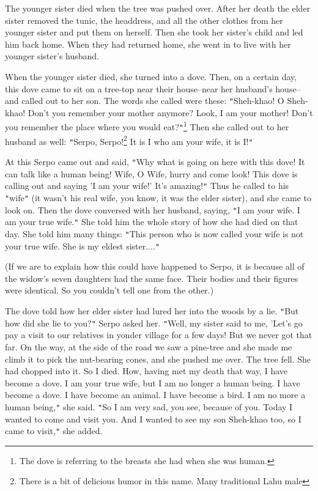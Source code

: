 The younger sister died when the tree was pushed over. After her death the elder
sister removed the tunic, the headdress, and all the other clothes from her younger
sister and put them on herself. Then she took her sister's child and led him back
home. When they had returned home, she went in to live with her younger sister's
husband.

When the younger sister died, she turned into a dove. Then, on a certain day, this
dove came to sit on a tree-top near their house--near her husband's house--and
called out to her son. The words she called were these: \texttt{"}Sheh-khao! O
Sheh-khao! Don't you remember your mother anymore? Look, I am your mother! Don't
you remember the place where you would eat?\texttt{"}\footnote{The dove is referring to the breasts she had when she was human.} Then she called out to
her husband as well: \texttt{"}Serpo, Serpo!\footnote{There is a bit of delicious humor in this name. Many traditional Lahu male} It is I who am your wife, it is
I!\texttt{"}

At this Serpo came out and said, \texttt{"}Why what is going on here with this
dove! It can talk like a human being! Wife, O Wife, hurry and come look! This dove
is calling out and saying 'I am your wife!' It's amazing!\texttt{"} Thus he called
to his \texttt{"}wife\texttt{"} (it wasn't his real wife, you know, it was the
elder sister), and she came to look on. Then the dove conversed with her husband,
saying, \texttt{"}I am your wife. I am your true wife.\texttt{"} She told him the
whole story of how she had died on that day. She told him many things: \texttt{"}This
person who is now called your wife is not your true wife. She is my eldest sister....\texttt{"}

(If we are to explain how this could have happened to Serpo, it is because all
of the widow's seven daughters had the same face. Their bodies and their figures
were identical. So you couldn't tell one from the other.)

The dove told how her elder sister had lured her into the woods by a lie. \texttt{"}But
how did she lie to you?\texttt{"} Serpo asked her. \texttt{"}Well, my sister said
to me, 'Let's go pay a visit to our relatives in yonder village for a few days!
But we never got that far. On the way, at the side of the road we saw a pine-tree
and she made me climb it to pick the nut-bearing cones, and she pushed me over.
The tree fell. She had chopped into it. So I died. How, having met my death that
way, I have become a dove. I am your true wife, but I am no longer a human being.
I have become a dove. I have become an animal. I have become a bird. I am no more
a human being,\texttt{"} she said. \texttt{"}So I am very sad, you see, because
of you. Today I wanted to come and visit you. And I wanted to see my son Sheh-khao
too, so I came to visit,\texttt{"} she added.

